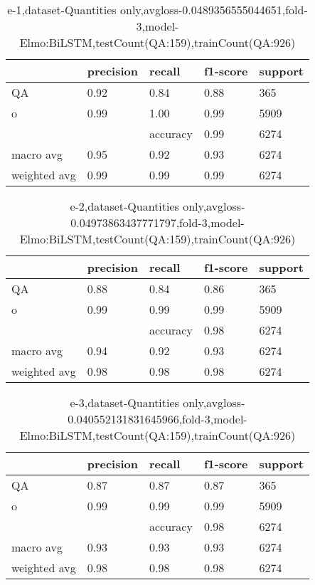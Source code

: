\begin{table}[!ht] 
\centering
\caption{e-1,dataset-Quantities only,avgloss-0.0489356555044651,fold-3,model-Elmo:BiLSTM,testCount(QA:159),trainCount(QA:926)}\label{e-1data-quantS.tsv}
\begin{tabularx}{300pt}{|X|X|X|X|X|}
\hline
&precision&recall&f1-score&support\\
\hline
QA&0.92&0.84&0.88&365\\
\hline
o&0.99&1.00&0.99&5909\\
\hline
&&accuracy&0.99&6274\\
\hline
macro avg&0.95&0.92&0.93&6274\\
\hline
weighted avg&0.99&0.99&0.99&6274\\
\hline
\end{tabularx}
\end{table}
\begin{table}[!ht] 
\centering
\caption{e-2,dataset-Quantities only,avgloss-0.04973863437771797,fold-3,model-Elmo:BiLSTM,testCount(QA:159),trainCount(QA:926)}\label{e-2data-quantS.tsv}
\begin{tabularx}{300pt}{|X|X|X|X|X|}
\hline
&precision&recall&f1-score&support\\
\hline
QA&0.88&0.84&0.86&365\\
\hline
o&0.99&0.99&0.99&5909\\
\hline
&&accuracy&0.98&6274\\
\hline
macro avg&0.94&0.92&0.93&6274\\
\hline
weighted avg&0.98&0.98&0.98&6274\\
\hline
\end{tabularx}
\end{table}
\begin{table}[!ht] 
\centering
\caption{e-3,dataset-Quantities only,avgloss-0.040552131831645966,fold-3,model-Elmo:BiLSTM,testCount(QA:159),trainCount(QA:926)}\label{e-3data-quantS.tsv}
\begin{tabularx}{300pt}{|X|X|X|X|X|}
\hline
&precision&recall&f1-score&support\\
\hline
QA&0.87&0.87&0.87&365\\
\hline
o&0.99&0.99&0.99&5909\\
\hline
&&accuracy&0.98&6274\\
\hline
macro avg&0.93&0.93&0.93&6274\\
\hline
weighted avg&0.98&0.98&0.98&6274\\
\hline
\end{tabularx}
\end{table}
